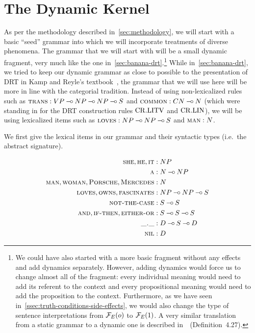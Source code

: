 \minitoc


\section{The Dynamic Kernel}
\label{sec:dynamic-kernel}

As per the methodology described in~\ref{sec:methodology}, we will start
with a basic ``seed'' grammar into which we will incorporate treatments of
diverse phenomena. The grammar that we will start with will be a small
dynamic fragment, very much like the one
in~\ref{sec:banana-drt}.\footnote{We could have also started with a more
  basic fragment without any effects and add dynamics separately. However,
  adding dynamics would force us to change almost all of the fragment:
  every individual meaning would need to add its referent to the context
  and every propositional meaning would need to add the proposition to the
  context. Furthermore, as we have seen
  in~\ref{ssec:truth-conditions-side-effects}, we would also change the
  type of sentence interpretations from $\mathcal{F}_E(o)$ to $\mathcal{F}_E(1)$. A very
  similar translation from a static grammar to a dynamic one is described
  in~\cite{lebedeva2012expression}~(Definition~4.27).} While
in~\ref{sec:banana-drt}, we tried to keep our dynamic grammar as close to
possible to the presentation of DRT in Kamp and Reyle's
textbook~\cite{kamp1993discourse}, the grammar that we will use here will
be more in line with the categorial tradition. Instead of using
non-lexicalized rules such as $\textsc{trans} : VP \mathbin{{-}\mkern-3.5mu{\circ}} NP \mathbin{{-}\mkern-3.5mu{\circ}} NP \mathbin{{-}\mkern-3.5mu{\circ}} S$
and $\textsc{common} : CN \mathbin{{-}\mkern-3.5mu{\circ}} N$ (which were standing in for the DRT
construction rules $\mathrm{CR.LITV}$ and $\mathrm{CR.LIN}$), we will be using lexicalized
items such as $\textsc{loves} : NP \mathbin{{-}\mkern-3.5mu{\circ}} NP \mathbin{{-}\mkern-3.5mu{\circ}} S$ and $\textsc{man} : N$.

We first give the lexical items in our grammar and their syntactic types
(i.e.\ the abstract signature).

\begin{align*}
  \textsc{she}, \textsc{he}, \textsc{it} &: NP \\
  \textsc{a} &: N \mathbin{{-}\mkern-3.5mu{\circ}} NP \\
  \textsc{man}, \textsc{woman}, \textsc{Porsche}, \textsc{Mercedes} &: N \\
  \textsc{loves}, \textsc{owns}, \textsc{fascinates} &: NP \mathbin{{-}\mkern-3.5mu{\circ}} NP \mathbin{{-}\mkern-3.5mu{\circ}} S \\
  \textsc{not-the-case} &: S \mathbin{{-}\mkern-3.5mu{\circ}} S \\
  \textsc{and}, \textsc{if-then}, \textsc{either-or} &: S \mathbin{{-}\mkern-3.5mu{\circ}} S \mathbin{{-}\mkern-3.5mu{\circ}} S \\
  \textsc{\_.\_} &: D \mathbin{{-}\mkern-3.5mu{\circ}} S \mathbin{{-}\mkern-3.5mu{\circ}} D \\
  \textsc{nil} &: D
\end{align*}

